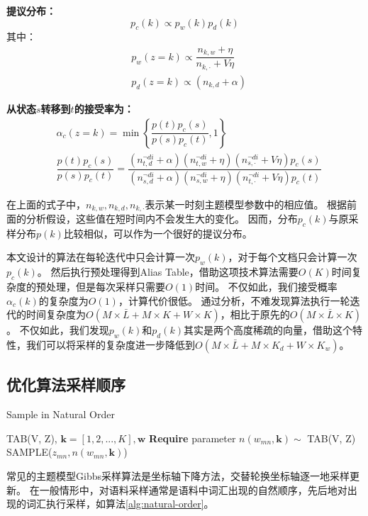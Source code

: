 \textbf{提议分布：}
\begin{equation}
 p_c(k) \propto p_w(k) p_d(k)
\end{equation}
其中：
\begin{equation}
\begin{aligned}
& p_w(z = k) \propto \dfrac{n_{k,w} +\eta}{n_{k, \cdot} + V \eta} \\
& p_d(z = k) \propto (n_{k,d} +\alpha) 
\end{aligned}
\end{equation}

\textbf{从状态$s$转移到$t$的接受率为：}
\begin{equation}
\begin{aligned}
& \alpha_c(z=k) = \min \left\{\dfrac{p(t) p_c(s)}{p(s)p_c(t)}, 1\right\} \\
& \dfrac{p(t) p_c(s)}{p(s)p_c(t)}= \dfrac{ (n_{t,d}^{\neg di} + \alpha)(n_{t,w}^{\neg di} + \eta) (n_{s,\cdot}^{\neg di} + V \eta) p_c(s)}
{ (n_{s,d}^{\neg di} + \alpha)(n_{s,w}^{\neg di} + \eta) (n_{t,\cdot}^{\neg di} + V \eta)p_c(t)}
\end{aligned}
\end{equation}

在上面的式子中，$n_{k,w}, n_{k, d}, n_{k, \cdot}$表示某一时刻主题模型参数中的相应值。
根据前面的分析假设，这些值在短时间内不会发生大的变化。
因而，分布$p_c(k)$与原采样分布$p(k)$比较相似，可以作为一个很好的提议分布。

本文设计的算法在每轮迭代中只会计算一次$p_w(k)$，对于每个文档只会计算一次$p_c(k)$。
然后执行预处理得到Alias Table，借助这项技术算法需要$O(K)$时间复杂度的预处理，但是每次采样只需要$O(1)$时间。
不仅如此，我们接受概率$\alpha_c(k)$的复杂度为$O(1)$，计算代价很低。
通过分析，不难发现算法执行一轮迭代的时间复杂度为$O(M \times \bar{L} + M \times K + W \times K)$，相比于原先的$O(M \times \bar{L} \times K)$。
不仅如此，我们发现$p_w(k)$和$p_d(k)$其实是两个高度稀疏的向量，借助这个特性，我们可以将采样的复杂度进一步降低到$O(M \times \bar{L} + M \times K_d + W \times K_w)$。


\subsection{优化算法采样顺序}

\begin{algorithm}[htb]
\caption{Sample in Natural Order}
\label{alg:natural-order}
\begin{algorithmic}[1] 
\Require TAB(V, Z), $\mathbf{k} = [1, 2, ..., K], \mathbf{w}$
\State \textbf{Require} parameter $n(w_{mn}, \mathbf{k}) \sim$ TAB(V, Z)
\State SAMPLE($z_{mn}, n(w_{mn}, \mathbf{k})$)
\EndFor
\EndFor
\end{algorithmic}  
\end{algorithm}  
常见的主题模型Gibbs采样算法是坐标轴下降方法，交替轮换坐标轴逐一地采样更新。
在一般情形中，对语料采样通常是语料中词汇出现的自然顺序，先后地对出现的词汇执行采样，如算法\ref{alg:natural-order}。

